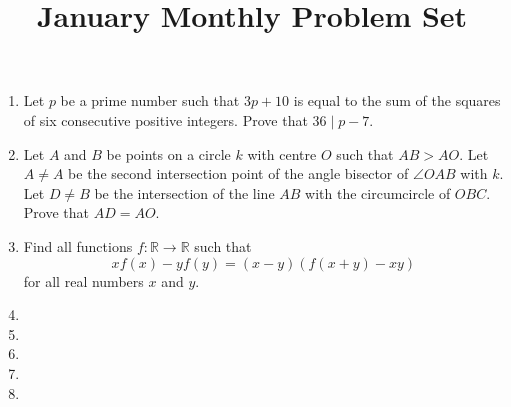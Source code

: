 \documentclass[12pt]{article}
\title{January Monthly Problem Set}
\begin{document}
 \maketitle

\begin{enumerate}

\item %
  Let $p$ be a prime number such that $3p+10$ is equal to the sum of the squares of six consecutive positive integers. Prove that $36 \mid p-7$.

 
\item %
Let $A$ and $B$ be points on a circle $k$ with centre $O$ such that $AB > AO$. Let $A \neq A$ be the second intersection point of the angle bisector of $\angle OAB$ with $k$. Let $D \neq B$ be the intersection of the line $AB$ with the circumcircle of $OBC$. Prove that $AD = AO$.


\item %
Find all functions $f : \mathbb{R} \to \mathbb{R}$ such that
  \[ xf(x) - yf(y) = (x - y)(f(x + y) - xy) \]
for all real numbers $x$ and $y$.


\item %


\item %


\item %


\item %


\item %


\end{enumerate}

\vfill

\centering
\begin{BVerbatim}
\end{BVerbatim}
\end{document}
